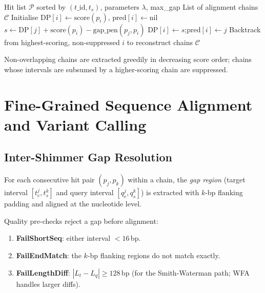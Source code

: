 \documentclass[11pt,a4paper]{article}
\begin{document}
\begin{algorithm}[H]
\caption{\textsc{SparseAln}: chain building by DP}
\begin{algorithmic}[1]
\Require Hit list $\mathcal{P}$ sorted by $(t\_\text{id}, t_s)$, parameters $\lambda$, max\_gap
\Ensure List of alignment chains $\mathcal{C}$
\State Initialise $\mathrm{DP}[i] \gets \mathrm{score}(p_i)$, $\mathrm{pred}[i] \gets \text{nil}$
      \State $s \gets \mathrm{DP}[j] + \mathrm{score}(p_i) - \mathrm{gap\_pen}(p_j, p_i)$
        \State $\mathrm{DP}[i] \gets s$;\quad $\mathrm{pred}[i] \gets j$
      \EndIf
    \EndIf
  \EndFor
\EndFor
\State Backtrack from highest-scoring, non-suppressed $i$ to reconstruct chains
\State \Return $\mathcal{C}$
\end{algorithmic}
\end{algorithm}

Non-overlapping chains are extracted greedily in decreasing score order;
chains whose intervals are subsumed by a higher-scoring chain are suppressed.

\section{Fine-Grained Sequence Alignment and Variant Calling}
\label{sec:finealn}

\subsection{Inter-Shimmer Gap Resolution}

For each consecutive hit pair $(p_j, p_k)$ within a chain, the \emph{gap region}
(target interval $[t_e^j, t_s^k]$ and query interval $[q_e^j, q_s^k]$)
is extracted with $k$-bp flanking padding and aligned at the nucleotide level.

Quality pre-checks reject a gap before alignment:
\begin{enumerate}[noitemsep]
  \item \textbf{FailShortSeq}: either interval $< 16$\,bp.
  \item \textbf{FailEndMatch}: the $k$-bp flanking regions do not match exactly.
  \item \textbf{FailLengthDiff}: $|L_t - L_q| \geq 128$\,bp
        (for the Smith-Waterman path; WFA handles larger diffs).
\end{enumerate}
\end{document}

